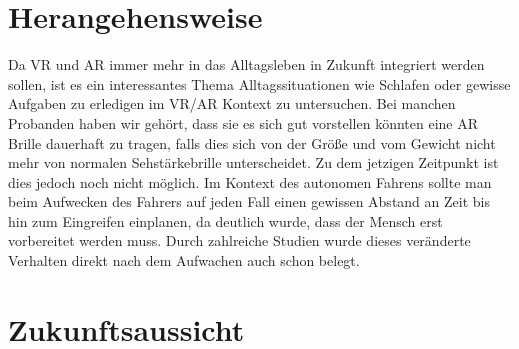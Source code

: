 \section{Herangehensweise}

Da VR und AR immer mehr in das Alltagsleben in Zukunft integriert werden sollen, ist es ein interessantes Thema Alltagssituationen wie Schlafen oder gewisse Aufgaben zu erledigen im VR/AR Kontext zu untersuchen. Bei manchen Probanden haben wir gehört, dass sie es sich gut vorstellen könnten eine AR Brille dauerhaft zu tragen, falls dies sich von der Größe und vom Gewicht nicht mehr von normalen Sehstärkebrille unterscheidet. Zu dem jetzigen Zeitpunkt ist dies jedoch noch nicht möglich.
Im Kontext des autonomen Fahrens sollte man beim Aufwecken des Fahrers auf jeden Fall einen gewissen Abstand an Zeit bis hin zum Eingreifen einplanen, da deutlich wurde, dass der Mensch erst vorbereitet werden muss. Durch zahlreiche Studien wurde dieses veränderte Verhalten direkt nach dem Aufwachen auch schon belegt.

\section{Zukunftsaussicht}


